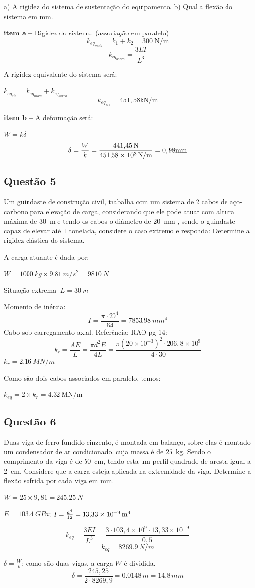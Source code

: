 a) A rigidez do sistema de sustentação do equipamento.
b) Qual a flexão do sistema em mm.

\resol

\textbf{item a --} Rigidez do sistema:
(associação em paralelo)
\[
    k_{eq_{mola}}=k_1+k_2=\SI{300}{\newton\per\meter}
\]
\[
    k_{eq_{barra}}=\frac{3E I}{L^3}
\]

A rigidez equivalente do sistema será:

$k_{eq_{sis}} =k_{eq_{mola}} + k_{eq_{barra}}$
\[
    k_{eq_{sis}}=451,58\mathrm{kN/m}
\]

\textbf{item b --} A deformação será:

$W=k\delta$
\[
    \delta=\frac{W}{k}=\frac{\SI{441,45}{\newton}}{\SI{451,58d
    3}{\newton\per\meter}}=0,98\mm
\]

\subsection{Questão 5}
Um guindaste de construção civil, trabalha com um sistema de 2 cabos de
aço-carbono para elevação de carga, considerando que ele pode atuar com altura
máxima de \SI{30}{m} e tendo os cabos o diâmetro de \SI{20}{mm} , sendo o
guindaste capaz de elevar até 1 tonelada, considere o caso extremo e responda:
Determine a rigidez elástica do sistema.

\resol
A carga atuante é dada por:

$W = \SI{1000}{kg}\times \SI{9,81}{m /s^2} = \SI{9810}{N}$

Situação extrema: $L = \SI{30}{m}$

Momento de inércia:
\[
    I = \frac{\pi \cdot 20^{4}}{64}= \SI{7853,98}{mm^4}
\]
Cabo sob carregamento axial. Referência: RAO pg 14:
\[
    k_r=\frac{A E}{L}=\frac{\pi d^{2}E}{4L} = \frac{\pi (20\times 10^{-3})^2 \cdot 206,8 \times 10^9 }{4\cdot 30}
\]
$k_{r}=\SI{2,16}{MN /m}$

Como são dois cabos associados em paralelo, temos:

$k_{eq}= 2\times k_{r}= \SI{4,32}{\mega\newton\per\meter}$

\subsection{Questão 6}%
Duas viga de ferro fundido cinzento, é montada em balanço, sobre elas é montado
um condensador de ar condicionado, cuja massa é de \SI{25}{kg}. Sendo o
comprimento da viga é de \SI{50}{cm}, tendo esta um perfil quadrado de aresta
igual a \SI{2}{cm}. Considere que a carga esteja aplicada na extremidade da
viga. Determine a flexão sofrida por cada viga em mm.

\resol
$W=25\times 9,81 = \SI{245,25}{N}$

$E=\SI{103,4}{GPa}$; $I=\frac{a^4}{12}=\SI{13,33d-9}{m^4}$

\[ k_{eq}=\frac{3E I}{L^3}=\frac{3\cdot 103,4\times 10^{9} \cdot 13,33 \times 10^{-9}}{0,5} \]
\[
k_{eq} = \SI{8269,9}{N /m}
\]

$\delta = \frac{W}{k}$; como são duas vigas, a carga $W$ é dividida.
\[
\delta = \frac{245,25}{2\cdot 8269,9} = \SI{0,0148}{m} = \SI{14,8}{mm}
\]
